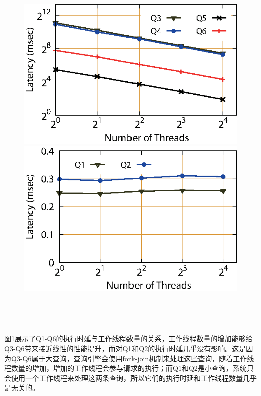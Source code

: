 \begin{figure}[!hpt]
\centering
\begin{minipage}{.45\linewidth}
\centering\includegraphics{figures/scale-thread1.eps}
\end{minipage}
\begin{minipage}{.45\linewidth}
\centering\includegraphics{figures/scale-thread2.eps}
\end{minipage} \\[10pt]
\begin{minipage}{1\linewidth}
\label{scale-thread}
\end{minipage} \\[-10pt]
\end{figure}

图\ref{scale-thread}展示了Q1-Q6的执行时延与工作线程数量的关系，工作线程数量的增加能够给Q3-Q6带来接近线性的性能提升，而对Q1和Q2的执行时延几乎没有影响。这是因为Q3-Q6属于大查询，查询引擎会使用fork-join机制来处理这些查询，随着工作线程数量的增加，增加的工作线程会参与请求的执行；而Q1和Q2是小查询，系统只会使用一个工作线程来处理这两条查询，所以它们的执行时延和工作线程数量几乎是无关的。

